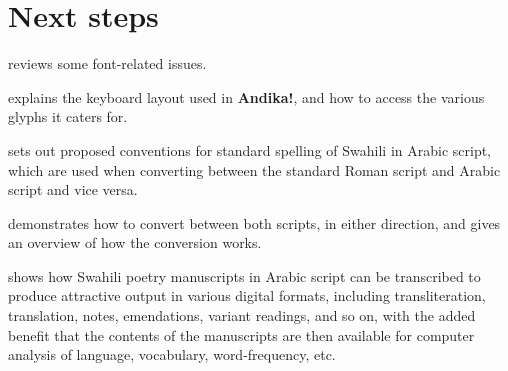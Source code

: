 \section{Next steps}

 reviews some font-related issues.

 explains the keyboard layout used in \textbf{Andika!}, and how to access the various glyphs it caters for.

 sets out proposed conventions for standard spelling of Swahili in Arabic script, which are used when converting between the standard Roman script and Arabic script and vice versa.

 demonstrates how to convert between both scripts, in either direction, and gives an overview of how the conversion works.

 shows how Swahili poetry manuscripts in Arabic script can be transcribed to produce attractive output in various digital formats, including transliteration, translation, notes, emendations, variant readings, and so on, with the added benefit that the contents of the manuscripts are then available for computer analysis of language, vocabulary, word-frequency, etc.
